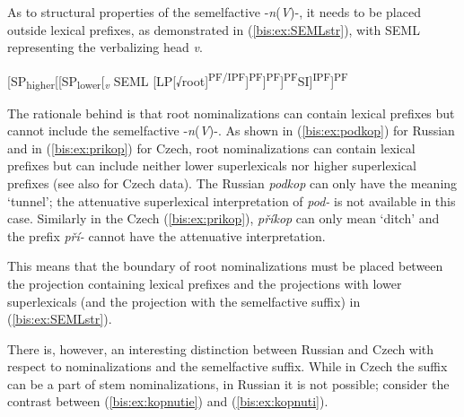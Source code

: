 \documentclass[output=paper]{langscibook}
\begin{document}
As to structural properties of the semelfactive -\textit{n}(\textit{V})-, it needs to be placed outside lexical prefixes, as demonstrated in (\ref{bis:ex:SEMLstr}), with SEML representing the verbalizing head \textit{v}. 

\ea\label{bis:ex:SEMLstr}	
[SP\textsubscript{higher}[[SP\textsubscript{lower}[\textsubscript{\textit{v}} SEML [LP[√root]\textsuperscript{PF/IPF}]\textsuperscript{PF}]\textsuperscript{PF}]\textsuperscript{PF}SI]\textsuperscript{IPF}]\textsuperscript{PF} 
\z

\noindent The rationale behind is that root nominalizations can contain lexical prefixes but cannot include the semelfactive -\textit{n}(\textit{V})-. As shown in (\ref{bis:ex:podkop}) for Russian and in (\ref{bis:ex:prikop}) for Czech, root nominalizations can contain lexical prefixes but can include neither lower superlexicals nor higher superlexical prefixes (see also \citealt{Caha.Zikova2016} for Czech data). The Russian \textit{podkop} can only have the meaning ‘tunnel’; the attenuative superlexical interpretation of \textit{pod-} is not available in this case. Similarly in the Czech (\ref{bis:ex:prikop}), \textit{příkop} can only mean ‘ditch’ and the prefix \textit{pří-} cannot have the attenuative interpretation. 

\ea\label{bis:ex:podkop}
\z

\ex\label{bis:ex:prikop}
\z\z

\noindent This means that the boundary of root nominalizations must be placed between the projection containing lexical prefixes and the projections with lower superlexicals (and the projection with the semelfactive suffix) in (\ref{bis:ex:SEMLstr}).

There is, however, an interesting distinction between Russian and Czech with respect to nominalizations and the semelfactive suffix. While in Czech the suffix can be a part of stem nominalizations, in Russian it is not possible; consider the contrast between (\ref{bis:ex:kopnutie}) and (\ref{bis:ex:kopnuti}).
\end{document}
